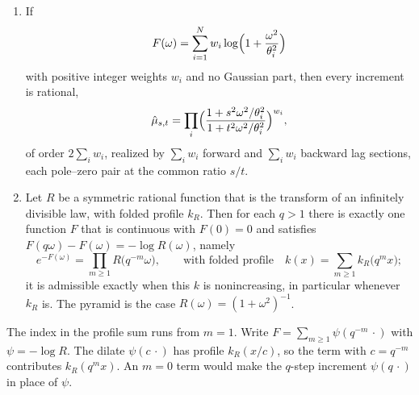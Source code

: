 \begin{proposition}
\label{prop:rational-increments}
\begin{enumerate}
\item If
\[
  F(\omega) = \sum_{i=1}^N w_i\log\Bigl(1 + \frac{\omega^2}{\theta_i^2}\Bigr)
\]
with positive integer weights $w_i$ and no Gaussian part, then every increment is rational,
\[
  \hat\mu_{s,t} = \prod_i\Bigl(\frac{1 + s^2\omega^2/\theta_i^2}{1 + t^2\omega^2/\theta_i^2}\Bigr)^{w_i},
\]
of order $2\sum_i w_i$, realized by $\sum_i w_i$ forward and $\sum_i w_i$ backward lag sections,
each pole--zero pair at the common ratio $s/t$.
\item Let $R$ be a symmetric rational function that is the transform of an infinitely divisible
law, with folded \Levy{} profile $k_R$. Then for each $q > 1$ there is exactly one function $F$
that is continuous with $F(0) = 0$ and satisfies $F(q\omega) - F(\omega) = -\log R(\omega)$,
namely
\[
  e^{-F(\omega)} = \prod_{m \ge 1} R\bigl(q^{-m}\omega\bigr),
  \qquad \text{with folded profile} \quad
  k(x) = \sum_{m \ge 1} k_R\bigl(q^m x\bigr);
\]
it is admissible exactly when this $k$ is nonincreasing, in particular whenever $k_R$ is. The
\Matern{} pyramid is the case $R(\omega) = (1+\omega^2)^{-1}$.
\end{enumerate}
\end{proposition}

The index in the profile sum runs from $m = 1$. Write $F = \sum_{m \ge 1}\psi(q^{-m}\,\cdot)$
with $\psi = -\log R$. The dilate $\psi(c\,\cdot)$ has profile $k_R(x/c)$, so the term with
$c = q^{-m}$ contributes $k_R(q^mx)$. An $m = 0$ term would make the $q$-step increment
$\psi(q\,\cdot)$ in place of $\psi$.

